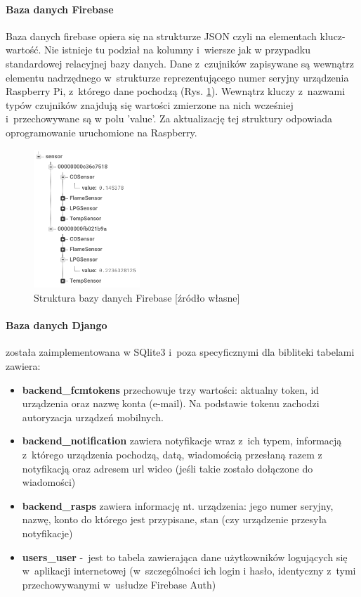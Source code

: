 \paragraph{Baza danych Firebase}
Baza danych firebase opiera się na strukturze JSON czyli na elementach klucz-wartość. Nie istnieje tu podział na kolumny i~wiersze jak w przypadku standardowej relacyjnej bazy danych. Dane z~czujników zapisywane są wewnątrz elementu nadrzędnego w~strukturze reprezentującego numer seryjny urządzenia Raspberry Pi, z~którego dane pochodzą (Rys. \ref{json}). Wewnątrz kluczy z~nazwami typów czujników znajdują się wartości zmierzone na nich wcześniej i~przechowywane są w polu 'value'. Za aktualizację tej struktury odpowiada oprogramowanie uruchomione na Raspberry.
\begin{figure}[H]
   \centering
   \includegraphics[width=4cm]{firebasejson.png} 
   \caption{Struktura bazy danych Firebase [źródło własne]}
   \label{json}
\end{figure}

\paragraph{Baza danych Django} została zaimplementowana w SQlite3 i~poza specyficznymi dla bibliteki tabelami zawiera:
\begin{itemize}
	\item \textbf{backend\_fcmtokens} przechowuje trzy wartości: aktualny token, id urządzenia oraz nazwę konta (e-mail). Na podstawie tokenu zachodzi autoryzacja urządzeń mobilnych.
	\item \textbf{backend\_notification} zawiera notyfikacje wraz z~ich typem, informacją z~którego urządzenia pochodzą, datą, wiadomością przesłaną razem z notyfikacją oraz adresem url wideo (jeśli takie zostało dołączone do wiadomości)
	\item \textbf{backend\_rasps} zawiera informację nt. urządzenia: jego numer seryjny, nazwę, konto do którego jest przypisane, stan (czy urządzenie przesyła notyfikacje)
	\item \textbf{users\_user} -~jest to tabela zawierająca dane użytkowników logujących się w~aplikacji internetowej (w~szczególności ich login i hasło, identyczny z~tymi przechowywanymi w~usłudze Firebase Auth)
\end{itemize}
